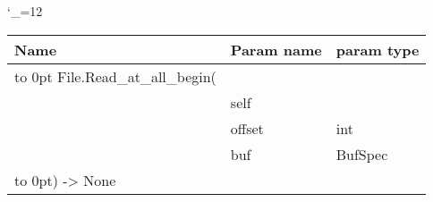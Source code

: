 \begingroup \catcode`\_=12 \tt
\begin{tabular}{lll}
\toprule
\textrm{Name}&\textrm{Param name}&\textrm{param type}\\
\midrule
\hbox to 0pt {File.Read_at_all_begin(\hss}\\
& self\\
& offset & int\\
& buf & BufSpec\\
\hbox to 0pt{) -> None\hss}\\
\bottomrule
\end{tabular}
\endgroup
